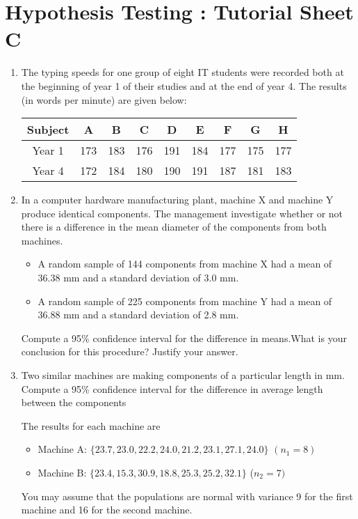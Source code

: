 \documentclass[]{article}
\begin{document}
\section*{Hypothesis Testing : Tutorial Sheet C}

\begin{enumerate}


\item The typing speeds for one group of eight IT students were recorded both at the beginning of
year 1 of their studies and at the end of year 4. The results (in words per minute) are given
below:
\begin{center}
\begin{tabular}{|c|c|c|c|c|c|c|c|c|} \hline 
  Subject & A& B& C& D& E& F& G& H \\ \hline
Year 1& 173& 183& 176& 191& 184& 177& 175& 177 \\ \hline
Year 4& 172& 184& 180& 190& 191& 187& 181& 183 \\ \hline
\end{tabular}
\end{center}


\item 
In a computer hardware manufacturing plant, machine X and machine Y
produce identical components. The management investigate whether or
not there is a difference in the mean diameter of the components from
both machines.
\begin{itemize}
\item A random sample of 144 components from machine X had a mean of
36.38 mm and a standard deviation of 3.0 mm.
\item  A random sample of 225 components from machine Y had a mean of
36.88 mm and a standard deviation of 2.8 mm.
\end{itemize}
Compute a 95\% confidence interval for the difference in means.What is your conclusion for this procedure? Justify your
answer.
\item Two similar machines are making components of a particular length in mm.
Compute a 95\% confidence interval for the difference in average length between the components

The results for each machine are
\begin{itemize}
\item Machine A: $\{23.7, 23.0, 22.2, 24.0, 21.2, 23.1, 27.1, 24.0\}$ $(n_1 = 8)$
\item Machine B: $\{23.4, 15.3, 30.9, 18.8, 25.3, 25.2, 32.1\}$ ($n_2 = 7)$
\end{itemize}

You may assume that the populations are normal with variance 9 for the first machine and 16 for
the second machine.


\end{enumerate}
\end{document}
